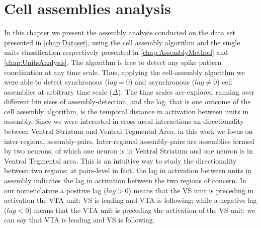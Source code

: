 \chapter{Cell assemblies analysis}
\label{chap:AssemblyAnalysis}
In this chapter we present the assembly analysis conducted on the data set presented in \autoref{chap:Dataset}, using the cell assembly algorithm and the single units classification respectively presented in \autoref{chap:AssemblyMethod} and \autoref{chap:UnitsAnalysis}.
The algorithm is free to detect any spike pattern coordination at any time scale.
Thus, applying the cell-assembly algorithm we were able to detect synchronous ($lag=0$) and asynchronous ($lag\neq 0$) cell assemblies at arbitrary time scale ($\Delta$). The time scales are explored running over different bin sizes of assembly-detection, and the lag, that is one outcome of the cell assembly algorithm, is the temporal distance in activation between units in assembly.
Since we were interested in cross areal interactions an directionality between Ventral Striatum and Ventral Tegmental Area, in this work we focus on inter-regional assembly-pairs. Inter-regional assembly-pairs are assemblies formed by two neurons, of which one neuron is in Ventral Striatum and one neuron is in Ventral Tegmental area. This is  an intuitive way to study the directionality between two regions: at pairs-level in fact, the lag in activation between units in assembly indicates the lag in activation between the two regions of concern. In our nomenclature a positive lag ($lag>0$) means that the VS unit is preceding in activation the VTA unit: VS is leading and VTA is following; while a negative lag ($lag<0$) means that the VTA unit is preceding the activation of the VS unit: we can say that VTA is leading and VS is following. 

